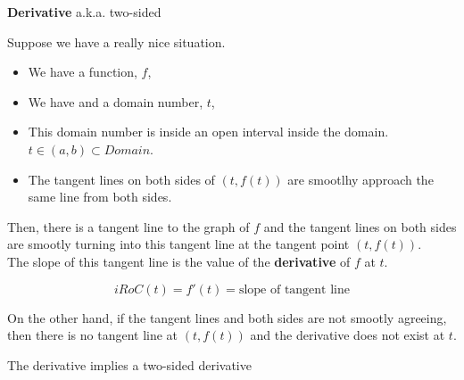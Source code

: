 \documentclass{ximera}
\begin{document}
\begin{definition} \textbf{\textcolor{green!50!black}{Derivative}}  a.k.a. two-sided 


Suppose we have a really nice situation.


\begin{itemize}
\item We have a function, $f$, 
\item We have and a domain number, $t$, 
\item This domain number is inside an open interval inside the domain.  $t \in (a, b) \subset Domain$. 
\item The tangent lines on both sides of $(t, f(t))$ are smootlhy approach the same line from both sides.
\end{itemize}

Then, there is a tangent line to the graph of $f$ and the tangent lines on both sides are smootly turning into this tangent line at the tangent point $(t, f(t))$. \\

The slope of this tangent line is the value of the \textbf{derivative} of $f$ at $t$.

\[
iRoC(t) =f'(t) = \text{slope of tangent line}
\]


On the other hand, if the tangent lines and both sides are not smootly agreeing, then there is no tangent line at $(t, f(t))$ and the derivative does not exist at $t$.   

\end{definition}

The derivative implies a two-sided derivative \\
\end{document}
